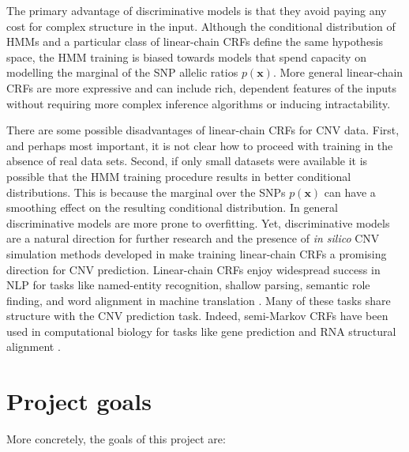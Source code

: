 \documentclass[11pt]{article}
\newcommand{\snp}{\mathbf{x}}
\begin{document}
The primary advantage of discriminative models is that they avoid paying any cost for complex structure in the input. Although the conditional distribution of HMMs and a particular class of linear-chain CRFs define the same hypothesis space, the HMM training is biased towards models that spend capacity on modelling the marginal of the SNP allelic ratios $p(\snp)$. More general linear-chain CRFs are more expressive and can include rich, dependent features of the inputs without requiring more complex inference algorithms or inducing intractability. 

There are some possible disadvantages of linear-chain CRFs for CNV data. First, and perhaps most important, it is not clear how to proceed with training in the absence of real data sets. Second, if only small datasets were available it is possible that the HMM training procedure results in better conditional distributions. This is because the marginal over the SNPs $p(\snp)$ can have a smoothing effect on the resulting conditional distribution. In general discriminative models are more prone to overfitting. Yet, discriminative models are a natural direction for further research and the presence of \textit{in silico} CNV simulation methods developed in \citep{rampasek2014fcnv} make training linear-chain CRFs a promising direction for CNV prediction. Linear-chain CRFs enjoy widespread success in NLP for tasks like named-entity recognition, shallow parsing, semantic role finding, and word alignment in machine translation \citep{sutton2012}. Many of these tasks share structure with the CNV prediction task.  Indeed, semi-Markov CRFs have been used in computational biology for tasks like gene prediction \citep{bernal2007} and RNA structural alignment \citep{Sato01012005}.

\section{Project goals}
More concretely, the goals of this project are:
\end{document}
